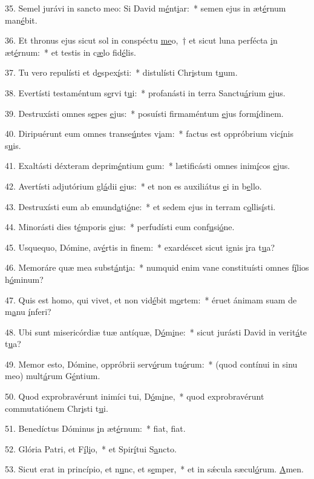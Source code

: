 35. Semel jurávi in sancto meo: Si David m\uline{é}nt\uline{i}ar:~* semen ejus in æt\uline{é}rnum man\uline{é}bit.\par 
36. Et thronus ejus sicut sol in conspéctu \uline{me}o,~† et sicut luna perfécta \uline{i}n æt\uline{é}rnum:~* et testis in c\uline{æ}lo fid\uline{é}lis.\par 
37. Tu vero repulísti et d\uline{e}spex\uline{í}sti:~* distulísti Chr\uline{i}stum t\uline{u}um.\par 
38. Evertísti testaméntum s\uline{e}rvi t\uline{u}i:~* profanásti in terra Sanctu\uline{á}rium \uline{e}jus.\par 
39. Destruxísti omnes s\uline{e}pes \uline{e}jus:~* posuísti firmaméntum \uline{e}jus form\uline{í}dinem.\par 
40. Diripuérunt eum omnes transe\uline{ú}ntes v\uline{i}am:~* factus est oppróbrium vic\uline{í}nis s\uline{u}is.\par 
41. Exaltásti déxteram deprim\uline{é}ntium \uline{e}um:~* lætificásti omnes inim\uline{í}cos \uline{e}jus.\par 
42. Avertísti adjutórium gl\uline{á}dii \uline{e}jus:~* et non es auxiliátus \uline{e}i in b\uline{e}llo.\par 
43. Destruxísti eum ab emund\uline{a}ti\uline{ó}ne:~* et sedem ejus in terram c\uline{o}llis\uline{í}sti.\par 
44. Minorásti dies t\uline{é}mporis \uline{e}jus:~* perfudísti eum conf\uline{u}si\uline{ó}ne.\par 
45. Usquequo, Dómine, av\uline{é}rtis in f\uline{i}nem:~* exardéscet sicut ignis \uline{i}ra t\uline{u}a?\par 
46. Memoráre quæ mea subst\uline{á}nt\uline{i}a:~* numquid enim vane constituísti omnes f\uline{í}lios h\uline{ó}minum?\par 
47. Quis est homo, qui vivet, et non vid\uline{é}bit m\uline{o}rtem:~* éruet ánimam suam de m\uline{a}nu \uline{í}nferi?\par 
48. Ubi sunt misericórdiæ tuæ antíquæ, D\uline{ó}m\uline{i}ne:~* sicut jurásti David in verit\uline{á}te t\uline{u}a?\par 
49. Memor esto, Dómine, oppróbrii serv\uline{ó}rum tu\uline{ó}rum:~* (quod contínui in sinu meo) mult\uline{á}rum G\uline{é}ntium.\par 
50. Quod exprobravérunt inimíci tui, D\uline{ó}m\uline{i}ne,~* quod exprobravérunt commutatiónem Chr\uline{i}sti t\uline{u}i.\par 
51. Benedíctus Dóminus \uline{i}n æt\uline{é}rnum:~* f\uline{i}at, f\uline{i}at.\par 
52. Glória Patri, et F\uline{í}l\uline{i}o,~* et Spir\uline{í}tui S\uline{a}ncto.\par 
53. Sicut erat in princípio, et n\uline{u}nc, et s\uline{e}mper,~* et in sǽcula sæcul\uline{ó}rum. \uline{A}men.\par 
